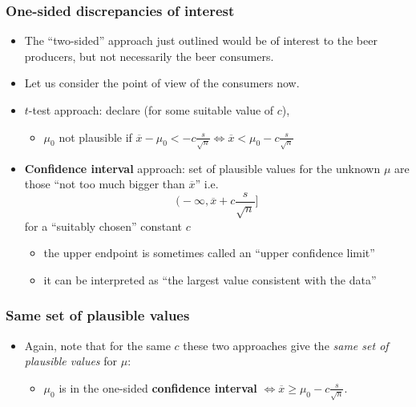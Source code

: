 \documentclass[a4paper]{article}\usepackage[]{graphicx}\usepackage[]{xcolor}
\begin{document}
\subsubsection{One-sided discrepancies of interest}
\begin{itemize}
	\item The ``two-sided'' approach just outlined would be of interest to the beer producers, but not necessarily the beer consumers.
	\item Let us consider the point of view of the consumers now.
	\item \( t \)-test approach: declare (for some suitable value of \( c \)),
	\begin{itemize}
		\item \( \mu_0 \) \textcolor{mygreen}{not plausible} if \( \overline{x} - \mu_0 < -c \frac{s}{\sqrt{n}} \Leftrightarrow \overline{x} < \mu_0 - c \frac{s}{\sqrt{n}} \) 
	\end{itemize}
	\item \textcolor{myred}{\textbf{Confidence interval}} approach: set of plausible values for the unknown \( \mu \) are those ``not too much bigger than \( \overline{x} \)'' i.e.
	\[
		\bigg( -\infty, \overline{x} + c \frac{s}{\sqrt{n}} \bigg]
	\]
	for a ``suitably chosen'' constant \( c \) 
	\begin{itemize}
		\item the upper endpoint is sometimes called an ``upper confidence limit''
		\item it can be interpreted as ``the largest value consistent with the data''
	\end{itemize}
\end{itemize}
\subsubsection{Same set of plausible values}
\begin{itemize}
	\item Again, note that for the same \( c \) these two approaches give the \textit{same set of plausible values} for \( \mu \):
	\begin{itemize}
		\item \( \mu_0 \) is in the one-sided \textcolor{myred}{\textbf{confidence interval}} \( \Leftrightarrow \overline{x} \geq \mu_0 - c \frac{s}{\sqrt{n}} \).
	\end{itemize}
\end{itemize}
\end{document}
